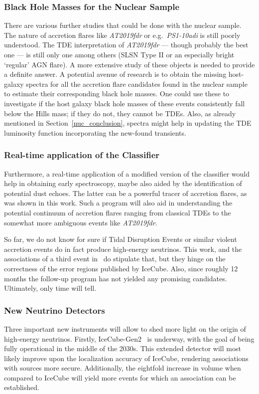 \subsubsection{Black Hole Masses for the Nuclear Sample}
There are various further studies that could be done with the nuclear sample. The nature of accretion flares like \textit{AT2019fdr} or e.g.~\textit{PS1-10adi} is still poorly understood. The TDE interpretation of \textit{AT2019fdr} --- though probably the best one ---  is still only one among others (SLSN Type II or an especially bright `regular' AGN flare). A more extensive study of these objects is needed to provide a definite answer. A potential avenue of research is to obtain the missing host-galaxy spectra for all the accretion flare candidates found in the nuclear sample to estimate their corresponding black hole masses. One could use these to investigate if the host galaxy black hole masses of these events consistently fall below the Hills mass; if they do not, they cannot be TDEs. Also, as already mentioned in Section~\ref{nuc_conclusion}, spectra might help in updating the TDE luminosity function incorporating the new-found transients.

\subsubsection{Real-time application of the Classifier}
Furthermore, a real-time application of a modified version of the classifier would help in obtaining early spectroscopy, maybe also aided by the identification of potential dust echoes. The latter can be a powerful tracer of accretion flares, as was shown in this work. Such a program will also aid in understanding the potential continuum of accretion flares ranging from classical TDEs to the somewhat more ambiguous events like \textit{AT2019fdr}.

So far, we do not know for sure if Tidal Disruption Events or similar violent accretion events do in fact produce high-energy neutrinos. This work, and the associations of a third event in~\cite{Velzen2021} do stipulate that, but they hinge on the correctness of the error regions published by IceCube. Also, since roughly 12 months the follow-up program has not yielded any promising candidates. Ultimately, only time will tell.

\subsubsection{New Neutrino Detectors}
Three important new instruments will allow to shed more light on the origin of high-energy neutrinos. Firstly, IceCube-Gen2~ is underway, with the goal of being fully operational in the middle of the 2030s. This extended detector will most likely improve upon the localization accuracy of IceCube, rendering associations with sources more secure. Additionally, the eightfold increase in volume when compared to IceCube will yield more events for which an association can be established.


